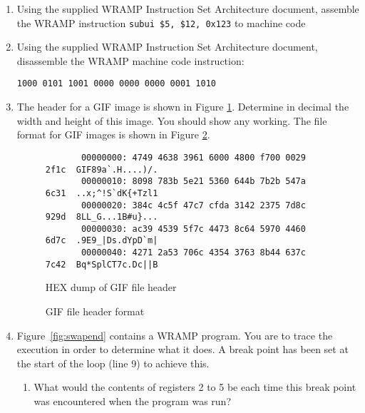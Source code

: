 \documentclass[a4paper,10pt]{article}
\begin{document}
\begin{enumerate}
\item Using the supplied WRAMP Instruction Set Architecture document,
assemble the WRAMP instruction \texttt{subui \$5, \$12, 0x123} to
machine code 

\item Using the supplied WRAMP Instruction Set Architecture document,
disassemble the WRAMP machine code instruction:
\begin{center}
\texttt{1000 0101 1001 0000 0000 0000 0001 1010}
\end{center}

\item The header for a GIF image is shown in Figure
\ref{fig:gifhex}. Determine in decimal the width and height of this
image. You should show any working. The file format for GIF images is
shown in Figure \ref{fig:gifheader}.  

\begin{figure}[h]
{\small
\begin{verbatim}
       00000000: 4749 4638 3961 6000 4800 f700 0029 2f1c  GIF89a`.H....)/.
       00000010: 8098 783b 5e21 5360 644b 7b2b 547a 6c31  ..x;^!S`dK{+Tzl1
       00000020: 384c 4c5f 47c7 cfda 3142 2375 7d8c 929d  8LL_G...1B#u}...
       00000030: ac39 4539 5f7c 4473 8c64 5970 4460 6d7c  .9E9_|Ds.dYpD`m|
       00000040: 4271 2a53 706c 4354 3763 8b44 637c 7c42  Bq*SplCT7c.Dc||B
\end{verbatim}}
\caption{HEX dump of GIF file header}
\label{fig:gifhex}
\end{figure}

\begin{figure}[h]
  \begin{center}
  \caption{GIF file header format}
  \label{fig:gifheader}
  \end{center}
\end{figure}

\newpage    

\item
\label{ques:swapend}

Figure~\ref{fig:swapend} contains a WRAMP program. You are to trace
the execution in order to determine what it does.  A break point has
been set at the start of the loop (line 9) to achieve this.

\begin{enumerate} 
\item What would the contents of registers 2 to 5 be each time this
break point was encountered when the program was run?


\end{enumerate}
\end{enumerate}
\end{document}
